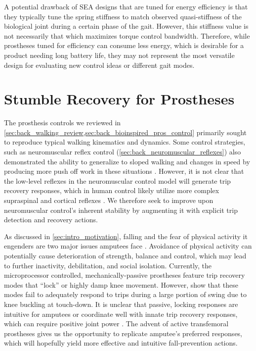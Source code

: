 A potential drawback of SEA designs that are tuned for energy efficiency is that
they typically tune the spring stiffness to match observed quasi-stiffness
of the biological joint during a certain phase of the gait. However, this
stiffness value is not necessarily that which maximizes torque control
bandwidth. Therefore, while prostheses tuned for efficiency can consume less
energy, which is desirable for a product needing long battery life, they may
not represent the most versatile design for evaluating new control ideas or
different gait modes. 

\section{Stumble Recovery for Prostheses}\label{sec:back_stumble_recovery}
The prosthesis controls we reviewed in
\cref{sec:back_walking_review,sec:back_bioinspired_pros_control} primarily
sought to reproduce typical walking kinematics and dynamics. Some control
strategies, such as neuromuscular reflex control
(\cref{sec:back_neuromuscular_reflexes}) also demonstrated the ability to
generalize to sloped walking and changes in speed by producing more push off
work in these situations \citep{eilenberg2010control, markowitz2011speed}.
However, it is not clear that the low-level reflexes in the neuromuscular
control model will generate trip recovery responses, which in human control
likely utilize more complex supraspinal and cortical reflexes
\citep{eng1994strategies, schillings2000muscular, hofstad2009evidence}.  We
therefore seek to improve upon neuromuscular control's inherent stability by
augmenting it with explicit trip detection and recovery actions.

As discussed in \cref{sec:intro_motivation}, falling and the fear of physical
activity it engenders are two major issues amputees face
\citep{miller2001prevalence}. Avoidance of physical activity can potentially
cause deterioration of strength, balance and control, which may lead to further
inactivity, debilitation, and social isolation. Currently, the microprocessor
controlled, mechanically-passive prostheses feature trip recovery modes that
``lock'' or highly damp knee movement. However, \citet{bellmann2010comparative}
show that these modes fail to adequately respond to trips during a large portion
of swing due to knee buckling at touch-down.  It is unclear that passive,
locking responses are intuitive for amputees or coordinate well with innate trip
recovery responses, which can require positive joint power
\citep{cordero2005energy}. The advent of active transfemoral prostheses gives us
the opportunity to replicate amputee's preferred responses, which will hopefully
yield more effective and intuitive fall-prevention actions.


